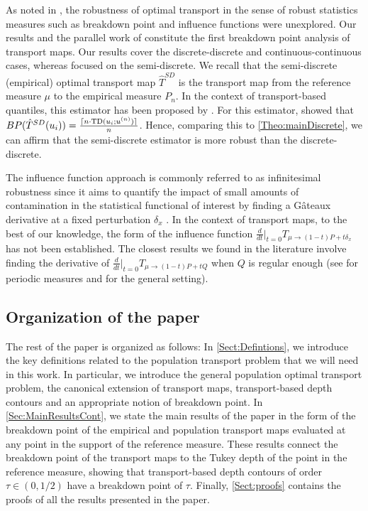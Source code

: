 \documentclass[11pt]{article}
\theoremstyle{plain}
\theoremstyle{definition}
\begin{document}
{ As noted in \cite{ronchetti2023}, the robustness of optimal transport in the sense of robust statistics measures such as breakdown point and influence functions were unexplored.  Our results and the parallel work of \cite{paindaveine:passeggeri2024} constitute the first breakdown point analysis of transport maps.}   { Our results cover the discrete-discrete and continuous-continuous cases, whereas \cite{paindaveine:passeggeri2024} focused on the semi-discrete.   We recall that the semi-discrete (empirical) optimal transport map $\hat{T}^{SD}$ is the transport map from the reference measure $\mu$ to the empirical measure $P_n$. In the context of transport-based quantiles, this estimator has been proposed by \cite{GhosalSen.19}. For this estimator, \cite{paindaveine:passeggeri2024} showed that  ${\rm BP}(\hat{T}^{SD}(u_i))= \frac{\lceil n\cdot \mathrm{TD}(u_i; u^{(n)})  \rceil }{n} $. Hence, comparing this to \autoref{Theo:mainDiscrete}, we can affirm that the semi-discrete estimator is more robust than the discrete-discrete.  } 


The influence function  approach is commonly referred to as infinitesimal robustness since it aims to quantify the impact of small amounts of contamination in the statistical functional of interest by finding a G\^ateaux derivative at a fixed perturbation $\delta_x$ \cite{hampel1974,hampeletal1986}.  In the context of transport maps, to the best of our knowledge, the form of the influence function 
$ \frac{d}{dt } \big\vert_{t=0}T_{\mu\to (1-t)P+t \delta_x} $ has not been established. The closest results  we found in the literature involve finding the derivative of 
$ \frac{d}{dt } \big\vert_{t=0}T_{\mu\to (1-t)P+t Q} $
when $Q$ is regular enough (see \cite{manole2024centrallimittheoremssmooth} for periodic measures  and \cite{gonzálezsanz2024linearizationmongeampereequationsdata} for the general setting).   

   
 
 
\subsection{Organization of the paper}


The rest of the paper is organized as follows: In \autoref{Sect:Defintions}, we introduce the key definitions related to the population transport problem that we will need in this work.  In particular, we introduce the general population optimal transport problem, the canonical extension of transport maps, transport-based depth contours and an appropriate notion of  breakdown point.  
In \autoref{Sec:MainResultsCont}, we state the main results of the paper in the form of the breakdown point of the empirical and population transport maps evaluated at any point in the support of the reference measure. These results connect the breakdown point of the transport maps to the Tukey depth of the point in the reference measure, showing that  transport-based depth contours of order $\tau \in (0,1/2)$ have a breakdown point of $\tau$. Finally, \autoref{Sect:proofs}
 contains the proofs of all the results presented in the paper.
\end{document}
